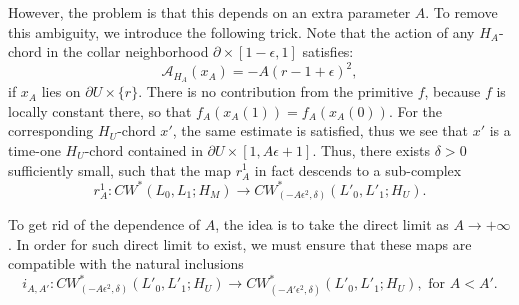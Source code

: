 \documentclass{amsart}
\numberwithin{equation}{section}
\numberwithin{figure}{section}
\begin{document}
	However, the problem is that this depends on an extra parameter $A$. To remove this ambiguity, we introduce the following trick. Note that the action of any $H_{A}$-chord in the collar neighborhood $\partial \times [1-\epsilon, 1]$ satisfies:
\begin{equation*}
\mathcal{A}_{H_{A}}(x_{A}) = -A(r-1+\epsilon)^{2},
\end{equation*}
if $x_{A}$ lies on $\partial U \times \{r\}$. There is no contribution from the primitive $f$, because $f$ is locally constant there, so that $f_{A}(x_{A}(1)) = f_{A}(x_{A}(0))$. For the corresponding $H_{U}$-chord $x'$, the same estimate is satisfied, thus we see that $x'$ is a time-one $H_{U}$-chord contained in $\partial U \times [1, A\epsilon + 1]$. Thus, there exists $\delta > 0$ sufficiently small, such that the map $r^{1}_{A}$ in fact descends to a sub-complex
\begin{equation}
r^{1}_{A}: CW^{*}(L_{0}, L_{1}; H_{M}) \to CW^{*}_{(-A\epsilon^{2}, \delta)}(L'_{0}, L'_{1}; H_{U}).
\end{equation} \par
	To get rid of the dependence of $A$, the idea is to take the direct limit as $A \to +\infty$. In order for such direct limit to exist, we must ensure that these maps are compatible with the natural inclusions
\begin{equation*}
i_{A, A'}: CW^{*}_{(-A\epsilon^{2}, \delta)}(L'_{0}, L'_{1}; H_{U}) \to CW^{*}_{(-A'\epsilon^{2}, \delta)}(L'_{0}, L'_{1}; H_{U}), \text{ for } A < A'.
\end{equation*}
\end{document}
